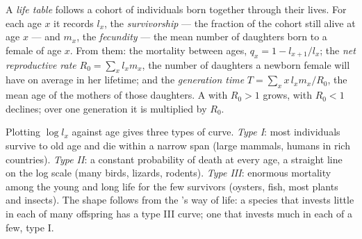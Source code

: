 \begin{definition}\label{def:b1:populations:lifetable}
A \emph{life table} follows a cohort of individuals born together
through their lives. For each age $x$ it records $l_x$, the
\emph{survivorship} --- the fraction of the cohort still alive at age
$x$ --- and $m_x$, the \emph{fecundity} --- the mean number of
daughters born to a female of age $x$. From them: the mortality
between ages, $q_x = 1 - l_{x+1}/l_x$; the \emph{net reproductive
rate} $R_0 = \sum_x l_x m_x$, the number of daughters a newborn female
will have on average in her lifetime; and the \emph{generation time}
$T = \sum_x x\,l_x m_x / R_0$, the mean age of the mothers of those
daughters. A  with $R_0 > 1$ grows, with $R_0 < 1$
declines; over one generation it is multiplied by $R_0$.
\end{definition}

\begin{proposition}\label{prop:b1:populations:survivorship}
Plotting $\log l_x$ against age gives three types of curve. \emph{Type
I}: most individuals survive to old age and die within a narrow span
(large mammals, humans in rich countries). \emph{Type II}: a constant
probability of death at every age, a straight line on the log scale
(many birds, lizards, rodents). \emph{Type III}: enormous mortality
among the young and long life for the few survivors (oysters, fish,
most plants and insects). The shape follows from the 's way
of life: a species that invests little in each of many offspring has
a type III curve; one that invests much in each of a few, type I.
\end{proposition}

